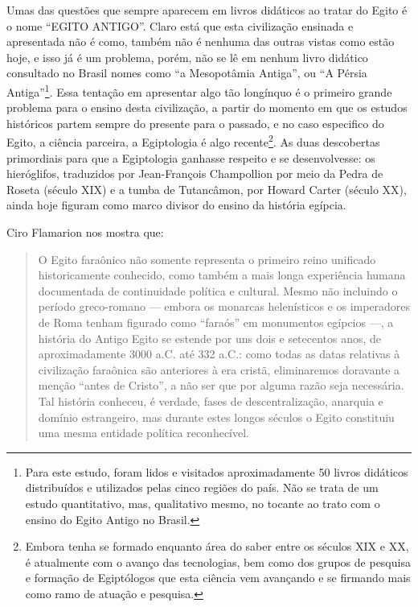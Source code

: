 \begin{refsection}
    Umas das questões que sempre aparecem em livros didáticos ao tratar do Egito é o nome ``EGITO ANTIGO''. Claro está que esta civilização ensinada e apresentada não é como, também não é nenhuma das outras vistas como estão hoje, e isso já é um problema, porém, não se lê em nenhum livro didático consultado no Brasil nomes como ``a Mesopotâmia Antiga'', ou ``A Pérsia Antiga''\footnote{Para este estudo, foram lidos e visitados aproximadamente 50 livros didáticos distribuídos e utilizados pelas cinco regiões do país. Não se trata de um estudo quantitativo, mas, qualitativo mesmo, no tocante ao trato com o ensino do Egito Antigo no Brasil.}. Essa tentação em apresentar algo tão longínquo é o primeiro grande problema para o ensino desta civilização, a partir do momento em que os estudos históricos partem sempre do presente para o passado, e no caso especifico do Egito, a ciência parceira, a Egiptologia é algo recente\footnote{Embora tenha se formado enquanto área do saber entre os séculos XIX e XX, é atualmente com o avanço das tecnologias, bem como dos grupos de pesquisa e formação de Egiptólogos que esta ciência vem avançando e se firmando mais como ramo de atuação e pesquisa.}. As duas descobertas primordiais para que a Egiptologia ganhasse respeito e se desenvolvesse: os hieróglifos, traduzidos por Jean-François Champollion por meio da Pedra de Roseta (século XIX) e a tumba de Tutancâmon, por Howard Carter (século XX), ainda hoje figuram como marco divisor do ensino da história egípcia.

    Ciro Flamarion \textcite[p.~7]{Cardoso2004Egito} nos mostra que:

    \begin{quotation}
        O Egito faraônico não somente representa o primeiro reino unificado historicamente conhecido, como também a mais longa experiência humana documentada de continuidade política e cultural. Mesmo não incluindo o período greco-romano --- embora os monarcas helenísticos e os imperadores de Roma tenham figurado como ``faraós'' em monumentos egípcios ---, a história do Antigo Egito se estende por uns dois e setecentos anos, de aproximadamente 3000 a.C. até 332 a.C.: como todas as datas relativas à civilização faraônica são anteriores à era cristã, eliminaremos doravante a menção ``antes de Cristo'', a não ser que por alguma razão seja necessária. Tal história conheceu, é verdade, fases de descentralização, anarquia e domínio estrangeiro, mas durante estes longos séculos o Egito constituiu uma mesma entidade política reconhecível.
    \end{quotation}


\end{refsection}
